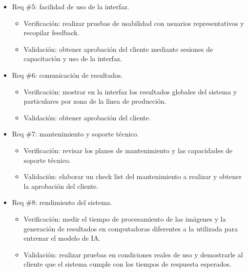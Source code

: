 \documentclass[
11pt, %
]{charter}
\begin{document}
\begin{itemize} 
\item Req \#5: facilidad de uso de la interfaz.
	\begin{itemize}
	\item Verificación: realizar pruebas de usabilidad con usuarios representativos y recopilar feedback.
	\item Validación: obtener aprobación del cliente mediante sesiones de capacitación y uso de la interfaz.
	\end{itemize}
\end{itemize}

\begin{itemize} 
\item Req \#6: comunicación de resultados.
	\begin{itemize}
	\item Verificación: mostrar en la interfaz los resultados globales del sistema y particulares por zona de la línea de producción.
	\item Validación: obtener aprobación del cliente.
	\end{itemize}
\end{itemize}

\begin{itemize} 
\item Req \#7: mantenimiento y soporte técnico.
	\begin{itemize}
	\item Verificación: revisar los planes de mantenimiento y las capacidades de soporte técnico.
	\item Validación: elaborar un check list del mantenimiento a realizar y obtener la aprobación del cliente.
	\end{itemize}
\end{itemize}

\begin{itemize} 
\item Req \#8: rendimiento del sistema.
	\begin{itemize}
	\item Verificación: medir el tiempo de procesamiento de las imágenes y la generación de resultados en  computadoras diferentes a la utilizada para entrenar el modelo de IA. 
	\item Validación: realizar pruebas en condiciones reales de uso y demostrarle al cliente que el sistema cumple con los tiempos de respuesta esperados.
	\end{itemize}
\end{itemize}
\end{document}
